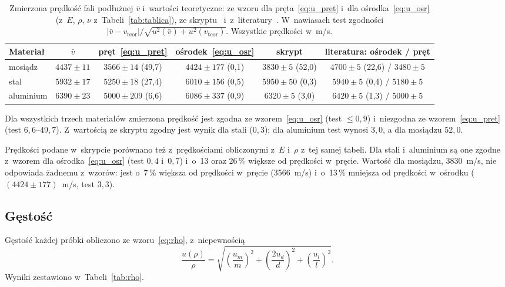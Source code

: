 \documentclass[12pt, a4paper]{article}
\begin{document}
\begin{table}[H]
    \centering
    \footnotesize
    \caption{Zmierzona prędkość fali podłużnej $\bar v$ i~wartości teoretyczne: ze wzoru dla
             pręta~\eqref{eq:u_pret} i~dla ośrodka~\eqref{eq:u_osr} (z~$E$, $\rho$, $\nu$
             z~Tabeli~\ref{tab:tablica}), ze skryptu~\cite{skrypt} i~z~literatury~\cite{sound}.
             W~nawiasach test zgodności $|\bar v - v_\text{teor}|/\sqrt{u^2(\bar v) + u^2(v_\text{teor})}$.
             Wszystkie prędkości w~m/s.}
    \label{tab:teoria}
    \begin{tabular}{lccccc}
        \toprule
        Materiał & $\bar v$ & pręt~\eqref{eq:u_pret} & ośrodek~\eqref{eq:u_osr}
                 & skrypt & literatura: ośrodek / pręt \\
        \midrule
        mosiądz   & $4437 \pm 11$ & $3566 \pm 14$ (49,7)  & $4424 \pm 177$ (0,1) & $3830 \pm 5$ (52,0)  & $4700 \pm 5$ (22,6) / $3480 \pm 5$ \\
        stal      & $5932 \pm 17$ & $5250 \pm 18$ (27,4)  & $6010 \pm 156$ (0,5) & $5950 \pm 50$ (0,3)  & $5940 \pm 5$ (0,4) / $5180 \pm 5$ \\
        aluminium & $6390 \pm 23$ & $5000 \pm 209$ (6,6)  & $6086 \pm 337$ (0,9) & $6320 \pm 5$ (3,0)   & $6420 \pm 5$ (1,3) / $5000 \pm 5$ \\
        \bottomrule
    \end{tabular}
\end{table}

Dla wszystkich trzech materiałów zmierzona prędkość jest zgodna ze wzorem~\eqref{eq:u_osr}
(test $\le 0{,}9$) i~niezgodna ze wzorem~\eqref{eq:u_pret} (test $6{,}6$--$49{,}7$).
Z~wartością ze skryptu zgodny jest wynik dla stali ($0{,}3$); dla aluminium test wynosi $3{,}0$,
a dla mosiądzu $52{,}0$.

Prędkości podane w~skrypcie porównano też z~prędkościami obliczonymi z~$E$ i~$\rho$ z~tej samej
tabeli. Dla stali i~aluminium są one zgodne z~wzorem dla ośrodka~\eqref{eq:u_osr} (test $0{,}4$
i~$0{,}7$) i~o~13 oraz 26\,\% większe od prędkości w~pręcie. Wartość dla mosiądzu, 3830~m/s, nie odpowiada
żadnemu z~wzorów: jest o~7\,\% większa od prędkości w~pręcie (3566~m/s) i~o~13\,\% mniejsza
od prędkości w~ośrodku ($(4424 \pm 177)$~m/s, test $3{,}3$).

\subsection{Gęstość}

Gęstość każdej próbki obliczono ze wzoru~\eqref{eq:rho}, z~niepewnością
\begin{equation}
    \frac{u(\rho)}{\rho} = \sqrt{\left(\frac{u_m}{m}\right)^2 + \left(\frac{2u_d}{d}\right)^2
    + \left(\frac{u_l}{l}\right)^2}.
    \label{eq:u_rho}
\end{equation}
Wyniki zestawiono w~Tabeli~\ref{tab:rho}.
\end{document}
